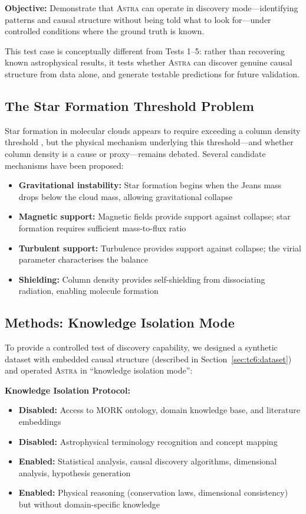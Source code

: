 \documentclass[usenatbib]{rasti}
\newcommand{\astra}{\textsc{Astra}\xspace}
\begin{document}
\textbf{Objective:} Demonstrate that \astra can operate in discovery mode---identifying patterns and causal structure without being told what to look for---under controlled conditions where the ground truth is known.

This test case is conceptually different from Tests 1--5: rather than recovering known astrophysical results, it tests whether \astra can discover genuine causal structure from data alone, and generate testable predictions for future validation.

\subsection{The Star Formation Threshold Problem}
\label{sec:tc6:problem}

Star formation in molecular clouds appears to require exceeding a column density threshold \citep{Andre2010}, but the physical mechanism underlying this threshold---and whether column density is a cause or proxy---remains debated.
Several candidate mechanisms have been proposed:
\begin{itemize}
  \item \textbf{Gravitational instability:} Star formation begins when the Jeans mass drops below the cloud mass, allowing gravitational collapse
  \item \textbf{Magnetic support:} Magnetic fields provide support against collapse; star formation requires sufficient mass-to-flux ratio
  \item \textbf{Turbulent support:} Turbulence provides support against collapse; the virial parameter characterises the balance
  \item \textbf{Shielding:} Column density provides self-shielding from dissociating radiation, enabling molecule formation
\end{itemize}

\subsection{Methods: Knowledge Isolation Mode}
\label{sec:tc6:methods}

To provide a controlled test of discovery capability, we designed a synthetic dataset with embedded causal structure (described in Section~\ref{sec:tc6:dataset}) and operated \astra in ``knowledge isolation mode'':

\textbf{Knowledge Isolation Protocol:}
\begin{itemize}
  \item \textbf{Disabled:} Access to MORK ontology, domain knowledge base, and literature embeddings
  \item \textbf{Disabled:} Astrophysical terminology recognition and concept mapping
  \item \textbf{Enabled:} Statistical analysis, causal discovery algorithms, dimensional analysis, hypothesis generation
  \item \textbf{Enabled:} Physical reasoning (conservation laws, dimensional consistency) but without domain-specific knowledge
\end{itemize}
\end{document}
